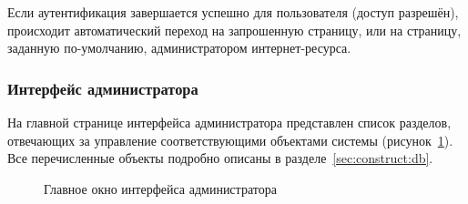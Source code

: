Если аутентификация завершается успешно для пользователя (доступ разрешён), происходит автоматический переход на запрошенную страницу, или на страницу, заданную по-умолчанию, администратором интернет-ресурса.  

\subsubsection{Интерфейс администратора}

На главной странице интерфейса администратора представлен список разделов,
отвечающих за управление соответствующими объектами системы
(рисунок~\ref{fig:admin_main}). Все перечисленные объекты подробно описаны в
разделе~\ref{sec:construct:db}.

\begin{figure}[hbt!]
\caption{Главное окно интерфейса администратора}
\label{fig:admin_main}
\end{figure}










